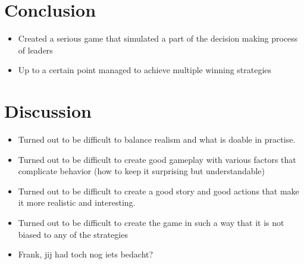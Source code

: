 \documentclass[11pt,a4paper]{article}
\begin{document}
\section{Conclusion}
  \begin{itemize}
    \item Created a serious game that simulated a part of the decision making process of leaders
    \item Up to a certain point managed to achieve multiple winning strategies
  \end{itemize}
\section{Discussion}
  \begin{itemize}
    \item Turned out to be difficult to balance realism and what is doable in practise.
    \item Turned out to be difficult to create good gameplay with various factors that complicate behavior (how to keep it surprising but understandable)
    \item Turned out to be difficult to create a good story and good actions that make it more realistic and interesting.
    \item Turned out to be difficult to create the game in such a way that it is not biased to any of the strategies
    \item Frank, jij had toch nog iets bedacht?
  \end{itemize}
\end{document}
